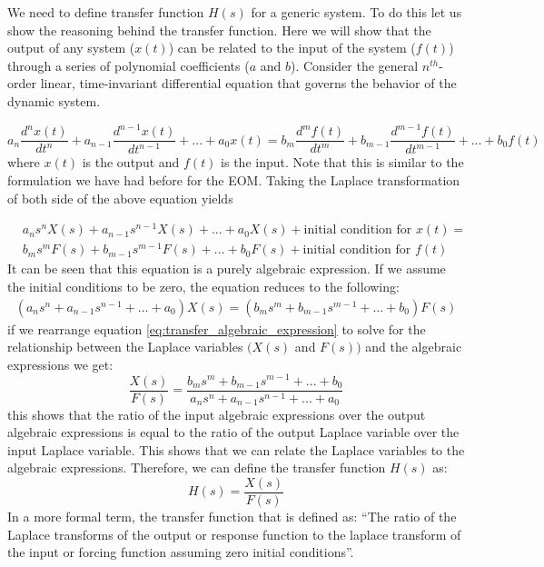 \documentclass[12pt,letter]{article}
\numberwithin{ex}{section} %
\numberwithin{re}{section} %
\begin{document}
We need to define transfer function $H(s)$ for a generic system. To do this let us show the reasoning behind the transfer function. Here we will show that the output of any system ($x(t)$) can be related to the input of the system ($f(t)$) through a series of polynomial coefficients ($a$ and $b$). Consider the general $n^{th}$-order linear, time-invariant differential equation that governs the behavior of the dynamic system.

\begin{equation}
a_n\frac{d^nx(t)}{dt^n} + a_{n-1}\frac{d^{n-1}x(t)}{dt^{n-1}} + ... + a_0x(t) = b_m\frac{d^mf(t)}{dt^m} + b_{m-1}\frac{d^{m-1}f(t)}{dt^{m-1}} + ... + b_0f(t)
\end{equation} 
where $x(t)$ is the output and $f(t)$ is the input. Note that this is similar to the formulation we have had before for the EOM. Taking the Laplace transformation of both side of the above equation yields

\begin{eqnarray}
&a_ns^nX(s) + a_{n-1}s^{n-1}X(s) + ... + a_0X(s) + \text{initial condition for } x(t) =   \\
&b_ms^mF(s) + b_{m-1}s^{m-1}F(s) + ... + b_0F(s) + \text{initial condition for } f(t)  \nonumber
\end{eqnarray}
It can be seen that this equation is a purely algebraic expression. If we assume the initial conditions to be zero, the equation reduces to the following:
\begin{eqnarray}
(a_ns^n + a_{n-1}s^{n-1} + ... + a_0)X(s) =  (b_ms^m + b_{m-1}s^{m-1} + ... + b_0)F(s) 
\label{eq:transfer_algebraic_expression}
\end{eqnarray}
if we rearrange equation \ref{eq:transfer_algebraic_expression} to solve for the relationship between the Laplace variables $\big( X(s)$ and $F(s) \big)$ and the algebraic expressions we get:
\begin{equation}
\frac{X(s)}{F(s)} = \frac{b_ms^m + b_{m-1}s^{m-1} + ... + b_0}{a_ns^n + a_{n-1}s^{n-1} + ... + a_0}
\end{equation}
this shows that the ratio of the input algebraic expressions over the output algebraic expressions is equal to the ratio of the output Laplace variable over the input Laplace variable. This shows that we can relate the Laplace variables to the algebraic expressions. Therefore, we can define the transfer function $H(s)$ as: 
\begin{equation}
H(s) = \frac{X(s)}{F(s)}
\label{eq:transfer_function}
\end{equation}
In a more formal term, the transfer function that is defined as: ``The ratio of the Laplace transforms of the output or response function to the laplace transform of the input or forcing function assuming zero initial conditions''.
\end{document}
